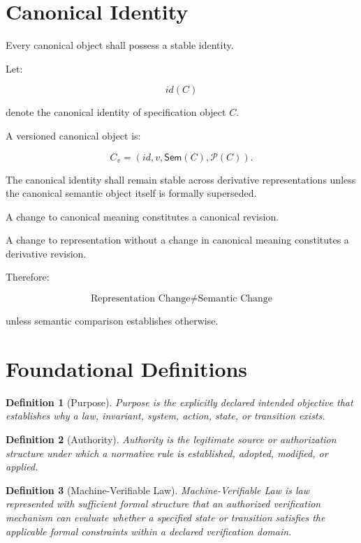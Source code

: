 \documentclass[11pt]{article}
\newcommand{\Prov}{\mathcal{P}}
\newcommand{\Sem}{\mathsf{Sem}}
\newtheorem{definition}{Definition}
\begin{document}
\section{Canonical Identity}

Every canonical object shall possess a stable identity.

Let:

\[
id(C)
\]

denote the canonical identity of specification object $C$.

A versioned canonical object is:

\[
C_v=(id,v,\Sem(C),\Prov(C)).
\]

The canonical identity shall remain stable across derivative
representations unless the canonical semantic object itself is
formally superseded.

A change to canonical meaning constitutes a canonical revision.

A change to representation without a change in canonical meaning
constitutes a derivative revision.

Therefore:

\[
\boxed{
\text{Representation Change}
\neq
\text{Semantic Change}
}
\]

unless semantic comparison establishes otherwise.

\section{Foundational Definitions}

\begin{definition}[Purpose]
Purpose is the explicitly declared intended objective that
establishes why a law, invariant, system, action, state, or
transition exists.
\end{definition}

\begin{definition}[Authority]
Authority is the legitimate source or authorization structure
under which a normative rule is established, adopted, modified,
or applied.
\end{definition}

\begin{definition}[Machine-Verifiable Law]
Machine-Verifiable Law is law represented with sufficient formal
structure that an authorized verification mechanism can evaluate
whether a specified state or transition satisfies the applicable
formal constraints within a declared verification domain.
\end{definition}
\end{document}

